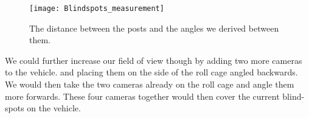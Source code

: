\begin{figure}[H]
\centerline{\texttt{[image: Blindspots\_measurement]}}
\caption[]{The distance between the posts and the angles we derived between them.}
\label{fig:blindspot_measurement}
\end{figure}

We could further increase our field of view though by adding two more cameras to the vehicle.  and placing them on the side of the roll cage angled backwards.  We would then take the two cameras already on the roll cage and angle them more forwards.  These four cameras together would then cover the current blind-spots on the vehicle.